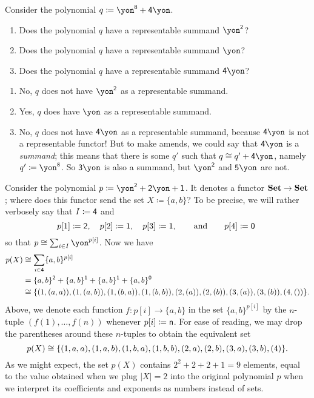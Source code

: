 \documentclass[Book-Poly]{subfiles}
\begin{document}
\begin{exercise}
    Consider the polynomial $q\coloneqq\yon^\8+\4\yon$.
    \begin{enumerate}
        \item Does the polynomial $q$ have a representable summand $\yon^\2$?
        \item Does the polynomial $q$ have a representable summand $\yon$?
        \item Does the polynomial $q$ have a representable summand $\4\yon$?
        \qedhere
    \end{enumerate}
    \begin{solution}
    \begin{enumerate}
        \item No, $q$ does not have $\yon^\2$ as a representable summand.
        \item Yes, $q$ does have $\yon$ as a representable summand.
        \item No, $q$ does not have $\4\yon$ as a representable summand, because $\4\yon$ is not a representable functor!
        But to make amends, we could say that $\4\yon$ is a \emph{summand}; this means that there is some $q'$ such that $q\iso q'+\4\yon$, namely $q'\coloneqq\yon^8$. So $\3\yon$ is also a summand, but $\yon^\2$ and $\5\yon$ are not.
    \end{enumerate}
    \end{solution}
\end{exercise}

\begin{example}\label{ex.verbose_poly_eval}
    Consider the polynomial $p\coloneqq\yon^\2+\2\yon+\1$.
    It denotes a functor $\mathbf{Set}\to\mathbf{Set}$; where does this functor send the set $X\coloneqq\{a,b\}$?
    To be precise, we will rather verbosely say that $I\coloneqq\textsf{4}$ and
    \[
    p[1]\coloneqq\textsf{2},\quad
    p[2]\coloneqq\textsf{1},\quad
    p[3]\coloneqq\textsf{1},\qquad\text{and}\qquad
    p[4]\coloneqq\textsf{0}\
    \]
    so that $p\cong\sum_{i\in I}\yon^{p[i]}$. Now we have
    \begin{align*}
        p(X) &\cong
        \sum_{i\in\textsf{4}}\{a,b\}^{p[i]} \\ &=
        \{a,b\}^{\textsf{2}} + \{a,b\}^{\textsf{1}} + \{a,b\}^{\textsf{1}} + \{a,b\}^{\textsf{0}} \\ &\cong
        \{(1,(a,a)),(1,(a,b)),(1,(b,a)),(1,(b,b)),(2,(a)),(2,(b)),(3,(a)),(3,(b)),(4,())\}.
    \end{align*}
    Above, we denote each function $f\colon p[i]\to\{a,b\}$ in the set $\{a,b\}^{p[i]}$ by the $n$-tuple $(f(1),\ldots,f(n))$ whenever $p[i]\coloneqq\mathsf{n}$.
    For ease of reading, we may drop the parentheses around these $n$-tuples to obtain the equivalent set
    \[
    p(X) \cong
    \{(1,a,a),(1,a,b),(1,b,a),(1,b,b),(2,a),(2,b),(3,a),(3,b),(4)\}.
    \]
    As we might expect, the set $p(X)$ contains $2^2+2+2+1=9$ elements, equal to the value obtained when we plug $|X|=2$ into the original polynomial $p$ when we interpret its coefficients and exponents as numbers instead of sets.
\end{example}
\end{document}
